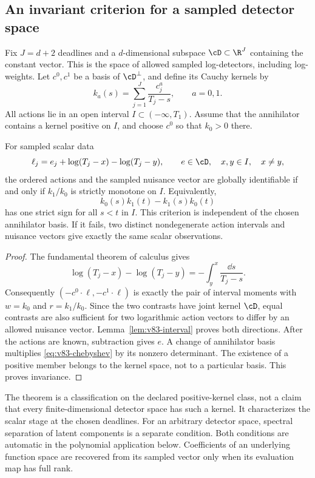 \subsection{An invariant criterion for a sampled detector space}
Fix $J=d+2$ deadlines and a $d$-dimensional subspace
$\cD\subset\R^J$ containing the constant vector. This is the space
of allowed sampled log-detectors, including log-weights. Let
$c^0,c^1$ be a basis of $\cD^\perp$, and define its Cauchy kernels by
\begin{equation}\label{eq:v83-kernels}
 k_a(s)=\sum_{j=1}^J\frac{c_j^a}{T_j-s},\qquad a=0,1.
\end{equation}
All actions lie in an open interval $I\subset(-\infty,T_1)$.
Assume that the annihilator contains a kernel positive on $I$, and
choose $c^0$ so that $k_0>0$ there.

\begin{theorem}
\label{thm:v83-classification}
For sampled scalar data
\[
 \ell_j=e_j+\log(T_j-x)-\log(T_j-y),\qquad
 e\in\cD,\quad x,y\in I,\quad x\ne y,
\]
the ordered actions and the sampled nuisance vector are globally
identifiable if and only if $k_1/k_0$ is strictly monotone on $I$.
Equivalently,
\begin{equation}\label{eq:v83-chebyshev}
 k_0(s)k_1(t)-k_1(s)k_0(t)
\end{equation}
has one strict sign for all $s<t$ in $I$.
This criterion is independent of the chosen annihilator basis.
If it fails, two distinct nondegenerate action intervals and nuisance
vectors give exactly the same scalar observations.
\end{theorem}
\begin{proof}
The fundamental theorem of calculus gives
\[
 \log(T_j-x)-\log(T_j-y)=-\int_y^x\frac{\dd s}{T_j-s}.
\]
Consequently $(-c^0\cdot\ell,-c^1\cdot\ell)$ is exactly the pair
of interval moments with $w=k_0$ and $r=k_1/k_0$. Since the two
contrasts have joint kernel $\cD$, equal contrasts are also sufficient
for two logarithmic action vectors to differ by an allowed nuisance
vector. Lemma~\ref{lem:v83-interval} proves both directions. After
the actions are known, subtraction gives $e$.
A change of annihilator basis multiplies \eqref{eq:v83-chebyshev} by
its nonzero determinant. The existence of a positive member belongs
to the kernel space, not to a particular basis. This proves invariance.
\end{proof}

The theorem is a classification on the declared positive-kernel class,
not a claim that every finite-dimensional detector space has such a
kernel. It characterizes the scalar stage at the chosen deadlines.
For an arbitrary detector space, spectral separation of latent
components is a separate condition. Both conditions are automatic in
the polynomial application below. Coefficients of an underlying
function space are recovered from its sampled vector only when its
evaluation map has full rank.

